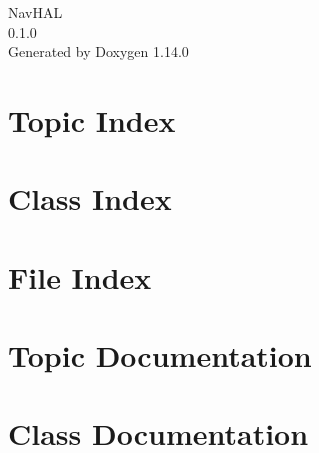 \documentclass[twoside]{book}
\newcommand{\+}{\discretionary{\mbox{\scriptsize$\hookleftarrow$}}{}{}}
\newcommand{\clearemptydoublepage}{%
    \newpage{\pagestyle{empty}\cleardoublepage}%
  }
\begin{document}
  \raggedbottom
    \hypersetup{pageanchor=false,
                bookmarksnumbered=true,
                pdfencoding=unicode
               }
  \begin{titlepage}
  \vspace*{7cm}
  \begin{center}%
  {\Large Nav\+HAL}\\
  [1ex]\large 0.\+1.\+0 \\
  \vspace*{1cm}
  {\large Generated by Doxygen 1.14.0}\\
  \end{center}
  \end{titlepage}
  \clearemptydoublepage
  \tableofcontents
  \clearemptydoublepage
  \hypersetup{pageanchor=true}




\chapter{Topic Index}

\chapter{Class Index}

\chapter{File Index}

\chapter{Topic Documentation}




\chapter{Class Documentation}








\end{document}
